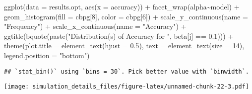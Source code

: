 \documentclass[
]{article}
\newenvironment{Shaded}{\begin{snugshade}}{\end{snugshade}}
\newcommand{\AttributeTok}[1]{\textcolor[rgb]{0.77,0.63,0.00}{#1}}
\newcommand{\DecValTok}[1]{\textcolor[rgb]{0.00,0.00,0.81}{#1}}
\newcommand{\FloatTok}[1]{\textcolor[rgb]{0.00,0.00,0.81}{#1}}
\newcommand{\FunctionTok}[1]{\textcolor[rgb]{0.00,0.00,0.00}{#1}}
\newcommand{\NormalTok}[1]{#1}
\newcommand{\SpecialCharTok}[1]{\textcolor[rgb]{0.00,0.00,0.00}{#1}}
\newcommand{\StringTok}[1]{\textcolor[rgb]{0.31,0.60,0.02}{#1}}
\begin{document}
\begin{Shaded}
\begin{Highlighting}[]
\FunctionTok{ggplot}\NormalTok{(}\AttributeTok{data =}\NormalTok{ results.opt,}
       \FunctionTok{aes}\NormalTok{(}\AttributeTok{x =}\NormalTok{ accuracy)) }\SpecialCharTok{+}
  \FunctionTok{facet\_wrap}\NormalTok{(alpha}\SpecialCharTok{\textasciitilde{}}\NormalTok{model) }\SpecialCharTok{+}
  \FunctionTok{geom\_histogram}\NormalTok{(}\AttributeTok{fill =}\NormalTok{ cbpg[}\DecValTok{8}\NormalTok{], }\AttributeTok{color =}\NormalTok{ cbpg[}\DecValTok{6}\NormalTok{]) }\SpecialCharTok{+}
  \FunctionTok{scale\_y\_continuous}\NormalTok{(}\AttributeTok{name =} \StringTok{"Frequency"}\NormalTok{) }\SpecialCharTok{+}
  \FunctionTok{scale\_x\_continuous}\NormalTok{(}\AttributeTok{name =} \StringTok{"Accuracy"}\NormalTok{) }\SpecialCharTok{+}
  \FunctionTok{ggtitle}\NormalTok{(}\FunctionTok{bquote}\NormalTok{(}\FunctionTok{paste}\NormalTok{(}\StringTok{"Distribution(s) of Accuracy for "}\NormalTok{, beta[j] }\SpecialCharTok{==} \FloatTok{0.1}\NormalTok{))) }\SpecialCharTok{+}
  \FunctionTok{theme}\NormalTok{(}\AttributeTok{plot.title =} \FunctionTok{element\_text}\NormalTok{(}\AttributeTok{hjust =} \FloatTok{0.5}\NormalTok{), }
        \AttributeTok{text =} \FunctionTok{element\_text}\NormalTok{(}\AttributeTok{size =} \DecValTok{14}\NormalTok{),}
        \AttributeTok{legend.position =} \StringTok{"bottom"}\NormalTok{)}
\end{Highlighting}
\end{Shaded}

\begin{verbatim}
## `stat_bin()` using `bins = 30`. Pick better value with `binwidth`.
\end{verbatim}

\texttt{[image: simulation\_details\_files/figure-latex/unnamed-chunk-22-3.pdf]}
\end{document}
